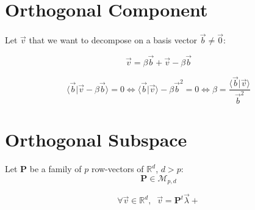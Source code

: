\documentclass[aps,12pt]{revtex4}
\begin{document}
\section{Orthogonal Component}
Let $\vec{v}$ that we want to decompose on a basis vector $\vec{b} \not= \vec{0}$:

\begin{equation}
	\vec{v} = \beta \vec{b} + \vec{v} - \beta \vec{b}
\end{equation}

\begin{equation}
	\langle	\vec{b} \vert \vec{v} - \beta \vec{b}\rangle = 0 \iff \langle \vec{b} \vert \vec{v} \rangle - \beta \vec{b}^2 = 0
	\iff \beta = \dfrac{\langle \vec{b} \vert \vec{v} \rangle}{\vec{b}^2}
\end{equation}


\section{Orthogonal Subspace}

Let $\bm{P}$ be a family of $p$ row-vectors of $\mathbb{R}^d$, $d>p$:
\begin{equation}
	\bm{P} \in \mathcal{M}_{p,d}
\end{equation}

\begin{equation}
\forall \vec{v} \in \mathbb{R}^d,\;\; \vec{v} = \bm{P}^t \vec{\lambda} +  
\end{equation}
\end{document}
